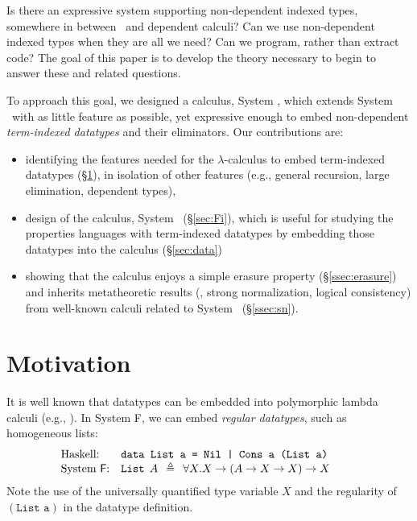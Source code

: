 Is there an expressive system supporting non-dependent indexed types,
somewhere in between \Fw\ and dependent calculi?
Can we use non-dependent indexed types when they are all we need?
Can we program, rather than extract code? The goal of this paper is
to develop the theory necessary to begin to answer these and related questions.

To approach this goal, we designed a calculus, System \Fi,
which extends System \Fw\ with as little feature as possible,
yet expressive enough to embed non-dependent \emph{term-indexed datatypes}
and their eliminators. Our contributions are:\vspace*{-5pt}
\begin{itemize}
\item identifying the features needed for the $\lambda$-calculus
    to embed term-indexed datatypes (\S\ref{sec:motiv}),
    in isolation of other features
    (e.g., general recursion, large elimination, dependent types),
    \vspace*{-2pt}
\item design of the calculus, System \Fi\ (\S\ref{sec:Fi}), which is
    useful for studying the properties languages with term-indexed datatypes
    by embedding those datatypes into the calculus (\S\ref{sec:data})
    \vspace*{-2pt}
\item showing that the calculus enjoys a simple erasure property
    (\S\ref{ssec:erasure}) and inherits metatheoretic results
    (\eg, strong normalization, logical consistency)
    from well-known calculi related to System \Fi\ (\S\ref{ssec:sn}).
\end{itemize}\vspace*{-3pt}


\section{Motivation}
\label{sec:motiv}
It is well known that datatypes can be embedded into polymorphic lambda calculi
(e.g., \cite{AbeMatUus03}).  In System \textsf{F}, we can embed \emph{regular datatypes},
such as homogeneous lists:
\[\!\!\!\!\!\!\!\!\!
\begin{array}{ll}
\text{Haskell:} & \texttt{data List a = Nil | Cons a (List a)} \\
\text{System \textsf{F}:} & \texttt{{List}}\:\: A\:\:\triangleq\:\:\forall X.X\to(A\to X\to X)\to X ~~\;
\end{array}
\]
Note the use of the universally quantified type variable $X$
and the regularity of $(\texttt{List a})$ in the datatype definition.

